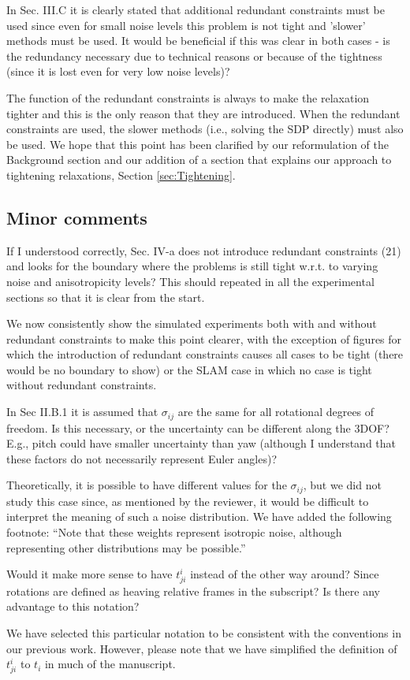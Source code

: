 In Sec. III.C it is clearly stated that additional redundant constraints must be used since even for small noise levels this problem is not tight and 'slower' methods must be used. It would be beneficial if this was clear in both cases - is the redundancy necessary due to technical reasons or because of the tightness (since it is lost even for very low noise levels)?
\begin{response}
    The function of the redundant constraints is always to make the relaxation tighter and this is the only reason that they are introduced. When the redundant constraints are used, the slower methods (i.e., solving the SDP directly) must also be used. We hope that this point has been clarified by our reformulation of the Background section and our addition of a section that explains our approach to tightening relaxations, Section \ref{sec:Tightening}.
\end{response}

\subsection*{Minor comments}

If I understood correctly, Sec. IV-a does not introduce redundant constraints (21) and looks for the boundary where the problems is still tight w.r.t. to varying noise and anisotropicity levels? This should repeated in all the experimental sections so that it is clear from the start. 
\begin{response}
    We now consistently show the simulated experiments both with and without redundant constraints to make this point clearer, with the exception of figures for which the introduction of redundant constraints causes all cases to be tight (there would be no boundary to show) or the SLAM case in which no case is tight without redundant constraints.
\end{response}

In Sec II.B.1 it is assumed that $\sigma_{ij}$ are the same for all rotational degrees of freedom. Is this necessary, or the uncertainty can be different along the 3DOF? E.g., pitch could have smaller uncertainty than yaw (although I understand that these factors do not necessarily represent Euler angles)?  
\begin{response}
    Theoretically, it is possible to have different values for the $\sigma_{ij}$, but we did not study this case since, as mentioned by the reviewer, it would be difficult to interpret the meaning of such a noise distribution. We have added the following footnote: ``Note that these weights represent isotropic noise, although representing other distributions may be possible.''
\end{response}
Would it make more sense to have $t_{ji}^i$ instead of the other way around? Since rotations are defined as heaving relative frames in the subscript? Is there any advantage to this notation?  
\begin{response}
    We have selected this particular notation to be consistent with the conventions in our previous work. However, please note that we have simplified the definition of $t_{ji}^i$ to $t_i$ in much of the manuscript.
\end{response}

